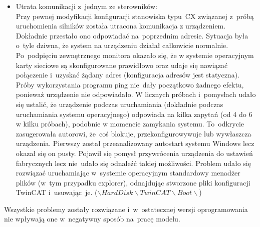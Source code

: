 \begin{itemize}
\item Utrata komunikacji z~jednym ze sterowników:\\[1mm]
Przy pewnej modyfikacji konfiguracji stanowiska typu~CX związanej z~próbą uruchomienia silników została utracona komunikacja z urządzeniem. Dokładnie przestało ono odpowiadać na~poprzednim adresie. Sytuacja była o~tyle dziwna, że system na urządzeniu działał całkowicie normalnie. Po~podpięciu zewnętrznego monitora okazało się, że w systemie operacyjnym karty sieciowe są skonfigurowane prawidłowo oraz udaje się nawiązać połączenie i~uzyskać żądany adres (konfiguracja adresów jest statyczna). Próby wykorzystania programu ping nie~dały początkowo żadnego efektu, ponieważ urządzenie nie odpowiadało. W licznych próbach i~pomysłach udało się ustalić, że urządzenie podczas uruchamiania (dokładnie podczas uruchamiania systemu operacyjnego) odpowiada na kilka zapytań (od 4 do 6 w kilku próbach), podobnie w momencie zamykania systemu. To~odkrycie zasugerowała autorowi, że~coś blokuje, przekonfigurowywuje lub wywłaszcza urządzenia. Pierwszy został przeanalizowany autostart systemu Windows lecz okazał się on pusty. Pojawił się pomysł przywrócenia urządzenia do ustawień fabrycznych lecz nie~udało się odnaleźć takiej możliwości. Problem udało się rozwiązać uruchamiając w~systemie operacyjnym standardowy menadżer plików (w~tym przypadku explorer), odnajdując stworzone pliki konfiguracji TwinCAT i~usuwając~je. ($\backslash Hard Disk\backslash TwinCAT\backslash Boot\backslash$)

\end{itemize}
\indent
\indent Wszystkie problemy zostały rozwiązane i~w~ostatecznej wersji oprogramowania nie wpływają one w~negatywny sposób na~pracę modelu.
